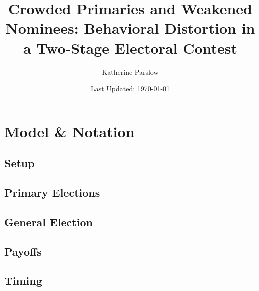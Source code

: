 \documentclass[12pt]{article}
\title{Crowded Primaries and Weakened Nominees: Behavioral Distortion in a Two-Stage Electoral Contest}
\author{Katherine Parslow}
\date{Last Updated: \today}
\begin{document}
\maketitle

\section*{Model \& Notation}

\subsection*{Setup}

\subsection*{Primary Elections}

\subsection*{General Election}

\subsection*{Payoffs}

\subsection*{Timing}
\end{document}
